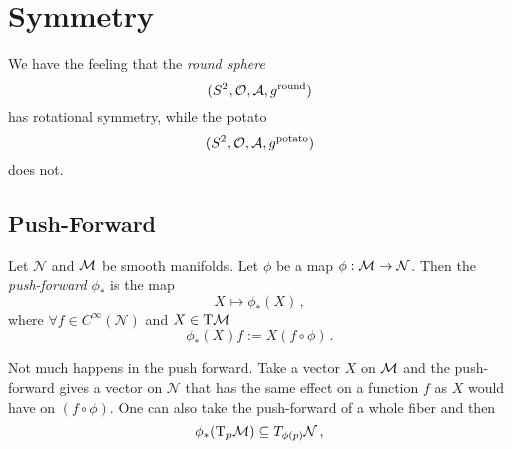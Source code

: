 \section{Symmetry}
We have the feeling that the \textit{round sphere}
\begin{equation}
    (S^2, \mathcal{O}, \mathcal{A}, g^{\text{round}})
\end{equation}
has rotational symmetry, while the potato
\begin{equation}
    (S^2, \mathcal{O}, \mathcal{A}, g^{\text{potato}})
\end{equation}
does not.

\subsection{Push-Forward}
\begin{defn}
    Let $\mathcal{N}$ and $\mathcal{M}$ be smooth manifolds.
    Let $\phi$ be a map $\phi: \mathcal{M} \to \mathcal{N}$.
    Then the \textit{push-forward} $\phi_*$ is the map
    \begin{equation}
        X \mapsto \phi_*(X)\,,
    \end{equation}
    where $\forall f \in C^\infty(\mathcal{N})$ and $X\in \T\M$
    \begin{equation}
        \phi_*(X)f:= X(f\circ \phi)\,.
    \end{equation}
\end{defn}
\begin{center}
\end{center}
\begin{center}
\end{center}
\begin{note}
    Not much happens in the push forward.
    Take a vector $X$ on $\mathcal{M}$ and the push-forward gives a vector on $\mathcal{N}$
    that has the same effect on a function $f$ as $X$ would have on $(f\circ\phi)$.
    One can also take the push-forward of a whole fiber and then
    \begin{equation}
        \phi_*(\T_p\M) \subseteq T_{\phi(p)}\mathcal{N}\,,
    \end{equation}
\end{note}
